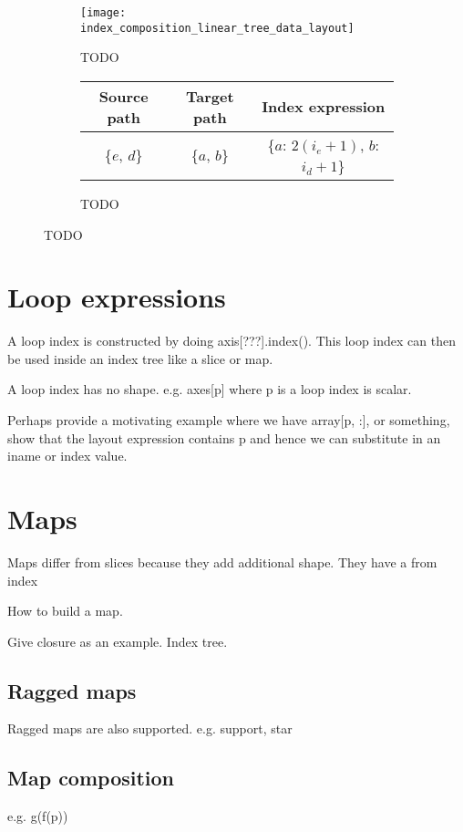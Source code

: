 \documentclass[thesis]{subfiles}
\begin{document}
\begin{figure}
  \centering
  \begin{subfigure}{\textwidth}
    \centering
    \texttt{[image: index\_composition\_linear\_tree\_data\_layout]}
    \caption{TODO}
    \label{fig:index_composition_linear_tree_data_layout}
  \end{subfigure}

  \vspace{1em}

  \begin{subfigure}{\textwidth}
    \centering
    \begin{tabular}{c|c|c}
      \textbf{Source path} & \textbf{Target path} & \textbf{Index expression} \\
      \hline
      \{$e$, $d$\} & \{$a$, $b$\} & \{$a$: $2 (i_e+1)$, $b$: $i_d+1$\} \\
    \end{tabular}
    \caption{TODO}
    \label{fig:index_composition_linear_tree_exprs}
  \end{subfigure}

  \caption{TODO}
  \label{fig:index_composition_linear_tree_all}
\end{figure}


\section{Loop expressions}


A loop index is constructed by doing axis[???].index().
This loop index can then be used inside an index tree like a slice or map.

A loop index has no shape. e.g. axes[p] where p is a loop index is scalar.

Perhaps provide a motivating example where we have array[p, :], or something, show that the layout expression contains p and hence we can substitute in an iname or index value.

\section{Maps}

Maps differ from slices because they add additional shape. They have a from index

How to build a map.

Give closure as an example. Index tree.

\subsection{Ragged maps}

Ragged maps are also supported. e.g. support, star

\subsection{Map composition}

e.g. g(f(p))
\end{document}
